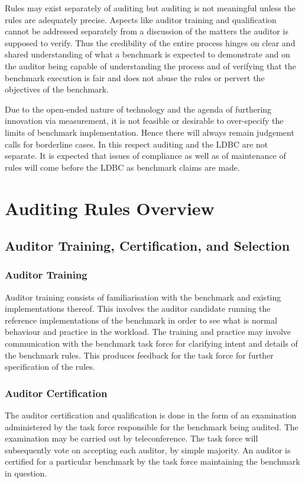Rules may exist separately of auditing but auditing is not meaningful unless the rules are adequately precise.
Aspects like auditor training and qualification cannot be addressed separately from a discussion of the matters the
auditor is supposed to verify. Thus the credibility of the entire process hinges on clear and shared understanding
of what a benchmark is expected to demonstrate and on the auditor being capable of understanding the process
and of verifying that the benchmark execution is fair and does not abuse the rules or pervert the objectives of
the benchmark.

Due to the open-ended nature of technology and the agenda of furthering innovation via measurement, it is
not feasible or desirable to over-specify the limits of benchmark implementation. Hence there will always remain
judgement calls for borderline cases. In this respect auditing and the LDBC are not separate. It is expected that
issues of compliance as well as of maintenance of rules will come before the LDBC as benchmark claims are
made.


\section{Auditing Rules Overview}


\subsection{Auditor Training, Certification, and Selection}
\subsubsection{Auditor Training}
Auditor training consists of familiarisation with the benchmark and existing implementations thereof. This involves the auditor candidate running the reference implementations of the benchmark in order to see what is normal behaviour and practice in the workload. The training and practice may involve communication with the benchmark task force for clarifying intent and details of the benchmark rules. This produces feedback for the task force for further specification of the rules.

\subsubsection{Auditor Certification}
The auditor certification and qualification is done in the form of an examination administered by the task force responsible for the benchmark being audited. The examination may be carried out by teleconference. The task force will subsequently vote on accepting each auditor, by simple majority. An auditor is certified for a particular benchmark by the task force maintaining the benchmark in question.

